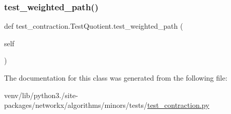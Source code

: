 \mbox{\label{classtest__contraction_1_1TestQuotient_a1dd9f7f409cd275fb3116b633a393ede}} 
\subsubsection{\texorpdfstring{test\+\_\+weighted\+\_\+path()}{test\_weighted\_path()}}
{\footnotesize\ttfamily def test\+\_\+contraction.\+Test\+Quotient.\+test\+\_\+weighted\+\_\+path (\begin{DoxyParamCaption}\item[{}]{self }\end{DoxyParamCaption})}



The documentation for this class was generated from the following file\+:\begin{DoxyCompactItemize}
\item 
venv/lib/python3./site-\/packages/networkx/algorithms/minors/tests/\hyperlink{test__contraction_8py}{test\+\_\+contraction.\+py}\end{DoxyCompactItemize}
